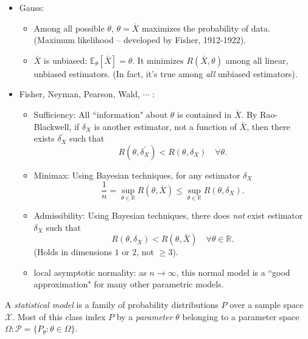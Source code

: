 \documentclass[a4paper]{article}
\begin{document}
\begin{answer*}
	\quad 
	\begin{itemize}
		\item Gauss: 
		\begin{itemize}
			\item Among all possible $\theta$, $\theta = \bar{X}$ maximizes the probability of data. (Maximum likelihood -- developed by Fisher, 1912-1922). 
			\item $\bar{X}$ is unbiased: $\mathbb{E}_{\theta}[\bar{X}] = \theta$. It minimizes $R(\bar{X},\theta)$ among all linear, unbiased estimators. (In fact, it's true among \emph{all} unbiased estimators).
		\end{itemize}
		\newpage
		\item Fisher, Neyman, Pearson, Wald, $\cdots$ : 
		\begin{itemize}
			\item Sufficiency: All ``information" about $\theta$ is contained in $\bar{X}$. By Rao-Blackwell, if $\delta_X$ is another estimator, not a function of $\bar{X}$, then there exists $\delta_X^{'}$ such that
			\begin{equation*}
				R(\theta,\delta_X^{'}) < R(\theta,\delta_X) \quad \forall \theta.
			\end{equation*}
			\item Minimax: Using Bayesian techniques, for any estimator $\delta_X$
			\begin{equation*}
				\frac{1}{n} = \sup_{\theta \in \mathbb{R}} R(\theta,\bar{X}) \leq \sup_{\theta \in \mathbb{R}} R(\theta,\delta_X).
			\end{equation*}
			\item Admissibility: Using Bayesian techniques, there does \emph{not} exist estimator $\delta_X$ such that
			\begin{equation*}
				R(\theta,\delta_X) < R(\theta,\bar{X}) \quad \forall \theta \in \mathbb{R}.
			\end{equation*}
			(Holds in dimensions $1$ or $2$, not $\geq 3$).
			\item local asymptotic normality: as $n \to \infty$, this normal model is a ``good approximation" for many other parametric models.
		\end{itemize}
	\end{itemize}
\end{answer*}

\begin{defi*}
	A \emph{statistical model} is a family of probability distributions $P$ over a sample space $\mathcal{X}$. Most of this class index $P$ by a \emph{parameter} $\theta$ belonging to a parameter space $\Omega: \mathcal{P} = \{P_{\theta}: \theta \in \Omega \}$.
\end{defi*}
\end{document}
